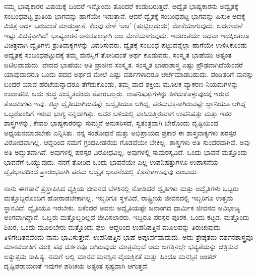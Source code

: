ನಮ್ಮ ಭಾಷ್ಯಕಾರರ ವಿಷಯಕ್ಕೆ ಬಂದರೆ ಇನ್ನೊಂದು ತೊಂದರೆ ಕಂಡುಬರುತ್ತದೆ. ಅದ್ವೈತ ಭಾಷ್ಯಕಾರನು ಅದ್ವೈತಕ್ಕೆ ಸಂಬಂಧಪಟ್ಟ ಶ್ರುತಿಯ ಭಾಗವನ್ನು ಹಾಗೆಯೇ ಇಡುತ್ತಾನೆ. ಆದರೆ ದ್ವೈತಕ್ಕೆ ಸಂಬಂಧಪಟ್ಟ ಭಾಗವನ್ನು ಹಿಸುಕಿ ಅದಕ್ಕೆ ವಿಚಿತ್ರ ಅರ್ಥ ಬರುವಂತೆ ಮಾಡುತ್ತಾನೆ. ಕೆಲವು ವೇಳೆ ‘ಅಜ’ (ಹುಟ್ಟಿಲ್ಲದುದು) ಮೇಕೆಯಾಗುವುದು. ಬದಲಾವಣೆ ಇಷ್ಟು ವಿಚಿತ್ರವಾಗಿದೆ! ಭಾಷ್ಯಕಾರನ ಅನುಕೂಲಕ್ಕಾಗಿ ಅಜ ಮೇಕೆಯಾಗುವುದು. ಇದರಂತೆಯೇ ಅಥವಾ ಇದಕ್ಕಿಂತಲೂ ವಿಚಿತ್ರವಾಗಿ ದ್ವೈತಿಗಳು ಶ್ರುತಿವಾಕ್ಯಗಳನ್ನು ವಿವರಿಸುವರು. ದ್ವೈತಕ್ಕೆ ಸಂಬಂಧ ಪಟ್ಟುದನ್ನೆಲ್ಲಾ ಹಾಗೆಯೇ ಉಳಿಸಿಕೊಂಡು ಅದ್ವೈತಕ್ಕೆ ಸಂಬಂಧಪಟ್ಟುದಕ್ಕೆ ತಮ್ಮ ಮನಸ್ಸಿಗೆ ತೋರಿದಂತೆ ಅರ್ಥ ಕೊಡುವರು. ಸಂಸ್ಕೃತ ಭಾಷೆಯು ಅತ್ಯಂತ ಜಟಿಲವಾದುದು. ವೇದದ ಭಾಷೆಯು ಅತಿ ಪ್ರಾಚೀನ ಸಂಸ್ಕೃತ. ಸಂಸ್ಕೃತ ಭಾಷಾಶಾಸ್ತ್ರ ಎಷ್ಟು ಪ್ರೌಢವಾಗಿದೆಯೆಂದರೆ ಯಾವುದಾದರೂ ಒಂದು ಪದದ ಅರ್ಥದ ಮೇಲೆ ಎಷ್ಟು ವರ್ಷಗಳಾದರೂ ಚರ್ಚೆಮಾಡಬಹುದು. ಪಂಡಿತರಿಗೆ ಮನಸ್ಸು ಬಂದರೆ ಯಾವ ಹರಟೆಯನ್ನಾದರೂ ತೆಗೆದುಕೊಂಡು, ತಮ್ಮ ವಾದ ಶಕ್ತಿಯ ಮೂಲಕ ವ್ಯಾಕರಣ ನಿಯಮಗಳನ್ನು ಉದಾಹರಿಸಿ ಅದು ಶುದ್ಧ ಸಂಸ್ಕೃತವೆಂದು ತೋರಬಲ್ಲರು. ಉಪನಿಷತ್ತುಗಳನ್ನು ತಿಳಿದುಕೊಳ್ಳುವುದಕ್ಕೆ ಇರುವ ತೊಡಕುಗಳು ಇವು. ಕಟ್ಟಾ ದ್ವೈತಿಯಾಗಿರುವಷ್ಟೇ ಅದ್ವೈತಿಯೂ ಆಗಿದ್ದ, ಪರಮಭಕ್ತನಾಗಿರುವಷ್ಟೇ ಜ್ಞಾನಿಯೂ ಆಗಿದ್ದ ಒಬ್ಬರೊಂದಿಗೆ ಇರುವ ಭಾಗ್ಯ ನನ್ನದಾಗಿತ್ತು. ಅವರ ಬಳಿಯಲ್ಲಿ ವಾಸಿಸುತ್ತಿರುವಾಗ ಉಪನಿಷತ್ತು ಮತ್ತು ಇತರ ಶಾಸ್ತ್ರಗಳನ್ನು, ಕೇವಲ ಭಾಷ್ಯಕಾರರನ್ನು ಸುಮ್ಮನೆ ಅನುಸರಿಸದೆ, ಸ್ವತಂತ್ರವಾಗಿ ಬೇರೊಂದು ದೃಷ್ಟಿಯಿಂದ ಅಧ್ಯಯನಮಾಡಬೇಕು ಎನ್ನಿಸಿತು. ನನ್ನ ಸಂಶೋಧನೆ ಮತ್ತು ಅಭಿಪ್ರಾಯದ ಪ್ರಕಾರ ಈ ಶಾಸ್ತ್ರವಾಕ್ಯಗಳು ಪರಸ್ಪರ ವಿರೋಧವಾಗಿಲ್ಲ. ಆದ್ದರಿಂದ ನಮಗೆ ಗ್ರಂಥಪೀಡನೆಯ ಗೊಡವೆಯೇ ಬೇಕಿಲ್ಲ. ಶಾಸ್ತ್ರಗಳು ಅತಿ ಸುಂದರವಾಗಿವೆ. ಅವು ಅತಿ ಅದ್ಭುತವಾಗಿವೆ. ಅವುಗಳಲ್ಲಿ ಪರಸ್ಪರ ವಿರೋಧವಿಲ್ಲ. ಅವುಗಳಲ್ಲಿ ಸಾಮರಸ್ಯವಿದೆ. ಒಂದು ಭಾವನೆ ಮತ್ತೊಂದು ಭಾವನೆಗೆ ಒಯ್ಯುವುದು. ನನಗೆ ತೋರಿದ ಒಂದು ಭಾವನೆಯೇ ಎಲ್ಲ ಉಪನಿಷತ್ತುಗಳೂ ಉಪಾಸನೆಯ ದ್ವೈತಭಾವದಿಂದ ಪ್ರಾರಂಭವಾಗಿ ಪರಮ ಅದ್ವೈತ ಭಾವನೆಯಲ್ಲಿ ಕೊನೆಗಾಣುವುವು ಎಂಬುದು.

ನಾನು ಈಗತಾನೆ ಪ್ರಸ್ತಾಪಿಸಿದ ವ್ಯಕ್ತಿಯ ಜೀವನದ ಬೆಳಕಿನಲ್ಲಿ ನೋಡಿದರೆ ದ್ವೈತಿಗಳು ಮತ್ತು ಅದ್ವೈತಿಗಳು ಒಬ್ಬರು ಮತ್ತೊಬ್ಬರೊಂದಿಗೆ ಹೋರಾಡಬೇಕಾಗಿಲ್ಲ, ಇಬ್ಬರಿಗೂ ಸ್ಥಳವಿದೆ, ರಾಷ್ಟ್ರೀಯ ಜೀವನದಲ್ಲಿ ಇಬ್ಬರಿಗೂ ಉತ್ತಮ ಸ್ಥಾನವಿದೆ. ದ್ವೈತಿಯೂ ಇರಬೇಕು. ಏಕೆಂದರೆ ಅವನು ಅದ್ವೈತಿಯಷ್ಟೇ ಜನಾಂಗದ ಧಾರ್ಮಿಕ ಜೀವನದ ಅವಿಭಾಜ್ಯ ಅಂಗವಾಗಿದ್ದಾನೆ. ಒಬ್ಬರು ಮತ್ತೊಬ್ಬರಿಲ್ಲದೆ ಜೀವಿಸಲಾರರು. ಇಬ್ಬರೂ ಪರಸ್ಪರ ಪೂರಕ. ಒಂದು ಕಟ್ಟಡ, ಮತ್ತೊಂದು ಶಿಖರ, ಒಂದು ಮೂಲಬೇರು ಮತ್ತೊಂದು ಫಲ. ಆದ್ದರಿಂದ ಉಪನಿಷತ್ತಿನ ಮೂಲವನ್ನು ತಿರುಚುವುದು ತಿಳಿಗೇಡಿತನವೆಂದು ನಾನು ಭಾವಿಸುತ್ತೇನೆ. ಉಪನಿಷತ್ತಿನ ಭಾಷೆ ಅಪೂರ್ವವಾದುದು. ಅದು ಶ್ರೇಷ್ಠತಮ ದರ್ಶನಶಾಸ್ತ್ರವೂ ಮಾನವಜಾತಿಗೆ ಮುಕ್ತಿ ಪಥ ದರ್ಶಕವೂ ಆಗಿರುವುದು ಮಾತ್ರವಲ್ಲದೆ ಅದು ಜಗತ್ತಿನಲ್ಲೇ ಭವ್ಯತೆಯನ್ನು ಚಿತ್ರಿಸುವ ಅತ್ಯುತ್ತಮ ಸಾಹಿತ್ಯ. ನಮಗೆ ಅಲ್ಲಿ ಮಾನವ ಮನಸ್ಸಿನ ವೈಯಕ್ತಿಕತೆ ಮತ್ತು ಹಿಂದೂ ಮನಸ್ಸಿನ ಅಂತರ್​ದೃಷ್ಟಿಪರಾಯಣತೆ ಇವುಗಳ ಪರಿಚಯ ಅತ್ಯಂತ ಸ್ಪಷ್ಟವಾಗಿ ಆಗುತ್ತದೆ.

